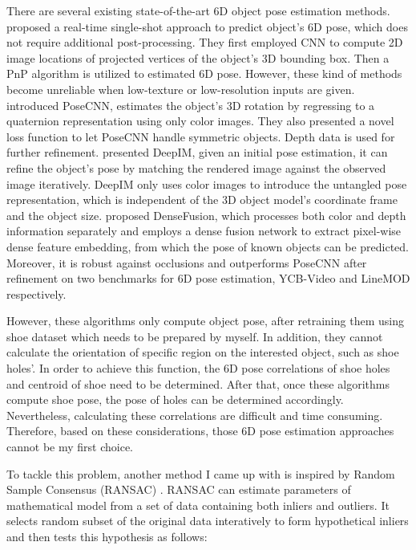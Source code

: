 There are several existing state-of-the-art 6D object pose estimation methods. \citep{singleshot} proposed a real-time single-shot approach to predict object's 6D pose, which does not require additional post-processing. They first employed CNN to compute 2D image locations of projected vertices of the object’s 3D bounding box. Then a PnP algorithm is utilized to estimated 6D pose. However, these kind of methods become unreliable when low-texture or low-resolution inputs are given. \citep{PoseCNN} introduced PoseCNN, estimates the object's 3D rotation by regressing to a quaternion representation using only color images. They also presented a novel loss function to let PoseCNN handle symmetric objects. Depth data is used for further refinement. \citep{DeepIM} presented DeepIM, given an initial pose estimation, it can refine the object's pose by matching the rendered image against the observed image iteratively. DeepIM only uses color images to introduce the untangled pose representation, which is independent of the 3D object model's coordinate frame and the object size. \citep{DenseFusion} proposed DenseFusion, which processes both color and depth information separately and employs a dense fusion network to extract pixel-wise dense feature embedding, from which the pose of known objects can be predicted. Moreover, it is robust against occlusions and outperforms PoseCNN after refinement on two benchmarks for 6D pose estimation, YCB-Video \citep{PoseCNN} and LineMOD \citep{linemod} respectively.

However, these algorithms only compute object pose, after retraining them using shoe dataset which needs to be prepared by myself. In addition, they cannot calculate the orientation of specific region on the interested object, such as shoe holes'. In order to achieve this function, the 6D pose correlations of shoe holes and centroid of shoe need to be determined. After that, once these algorithms compute shoe pose, the pose of holes can be determined accordingly. Nevertheless, calculating these correlations are difficult and time consuming. Therefore, based on these considerations, those 6D pose estimation approaches cannot be my first choice.

To tackle this problem, another method I came up with is inspired by Random Sample Consensus (RANSAC) \citep{rsc}. RANSAC can estimate parameters of mathematical model from a set of data containing both inliers and outliers. It selects random subset of the original data interatively to form hypothetical inliers and then tests this hypothesis as follows:

